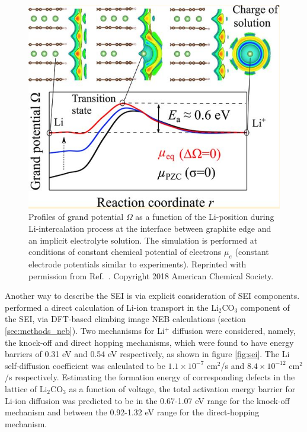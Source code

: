 \documentclass[../main.tex]{subfiles}
\begin{document}
\begin{figure}
    \centering
    \includegraphics[scale=0.6]{figures/graphite-interface.JPG}
    \caption{Profiles of grand potential $\Omega$ as a function of the Li-position during Li-intercalation process at the interface between graphite edge and an implicit electrolyte solution. The simulation is performed at conditions of constant chemical potential of electrons $\mu_e$ (constant electrode potentials similar to experiments). Reprinted with permission from Ref.~. Copyright 2018 American Chemical Society.}
    \label{fig:gel}
\end{figure}

Another way to describe the SEI is via explicit consideration of SEI components. \citeauthor{Shi2012} performed a direct calculation of Li-ion transport in the Li$_2$CO$_3$ component of the SEI,\cite{Shi2012} via DFT-based climbing image NEB calculations (section \ref{sec:methods_neb}). Two mechanisms for Li$^+$ diffusion were considered, namely, the knock-off and direct hopping mechanisms, which were found to have energy barriers of 0.31 eV and 0.54 eV respectively, as shown in figure \ref{fig:sei}. The Li self-diffusion coefficient was calculated to be $1.1\times10^{-7}$ cm$^2$/s and $8.4\times10^{-12}$ cm$^2$/s respectively. Estimating the formation energy of corresponding defects in the lattice of Li$_2$CO$_3$ as a function of voltage, the total activation energy barrier for Li-ion diffusion was predicted to be in the 0.67-1.07 eV range for the knock-off mechanism and between the 0.92-1.32 eV range for the direct-hopping mechanism.
\end{document}
